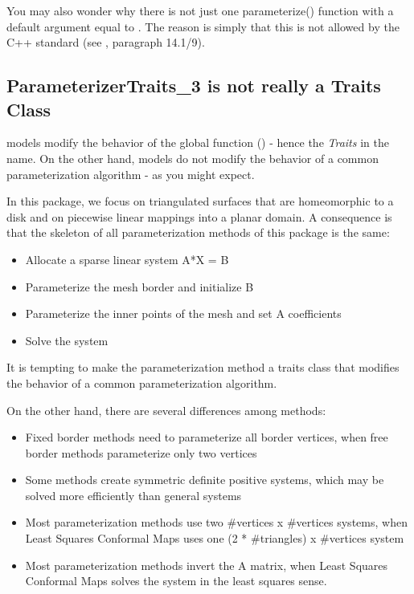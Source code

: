 You may also wonder why there is not just one parameterize() function with a
default  argument equal to
.
The reason is simply that this is not allowed by the C++ standard (see
\cite{cgal:ansi-is14882-98}, paragraph 14.1/9).


\subsection{ParameterizerTraits\_3 is not really a Traits Class}

 models modify the behavior of the global function
() - hence the {\em Traits} in the name.
On the other hand,  models do not modify the behavior
of a common parameterization algorithm - as you might expect.

In this package, we focus on triangulated surfaces that are homeomorphic to a
disk and on piecewise linear mappings into a planar domain.
A consequence is that the skeleton of all parameterization methods of this
package is the same:
\begin{itemize}
\item Allocate a sparse linear system A*X = B
\item Parameterize the mesh border and initialize B
\item Parameterize the inner points of the mesh and set A coefficients
\item Solve the system
\end{itemize}

It is tempting to make the parameterization method a traits class that
modifies the behavior of a common parameterization algorithm.

On the other hand, there are several differences among methods:
\begin{itemize}
\item Fixed border methods need to parameterize all border vertices,
      when free border methods parameterize only two vertices
\item Some methods create symmetric definite positive systems,
      which may be solved more efficiently than general systems
\item Most parameterization methods use two \#vertices x \#vertices systems,
      when Least Squares Conformal Maps uses one (2 * \#triangles) x \#vertices system
\item Most parameterization methods invert the A matrix,
      when Least Squares Conformal Maps solves the system in the least squares sense.
\end{itemize}

